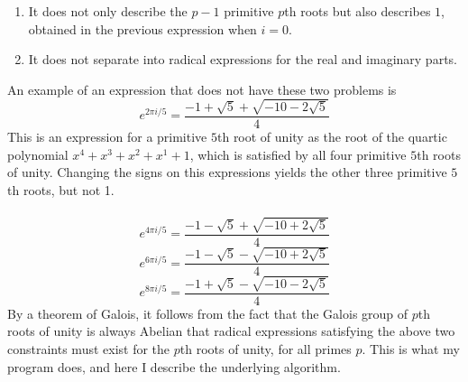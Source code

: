 \documentclass{article}
\begin{document}
    \begin{enumerate}
        \item It does not only describe the $ p - 1 $ primitive $ p $th roots but also describes $ 1 $, obtained in the previous expression when $ i = 0 $.
        \item It does not separate into radical expressions for the real and imaginary parts.
    \end{enumerate}
    An example of an expression that does not have these two problems is
$$ e^{2 \pi i/5} = \frac{-1 + \sqrt{5} + \sqrt{-10 - 2 \sqrt{5}}}{4} $$
    This is an expression for a primitive $ 5 $th root of unity as the root of the quartic polynomial $ x^4 + x^3 + x^2 + x^1 + 1 $, which is satisfied by all four primitive $ 5 $th roots of unity. Changing the signs on this expressions yields the other three primitive $ 5 $th roots, but not 1.\\
    \\
$$ e^{4 \pi i/5} = \frac{-1 - \sqrt{5} + \sqrt{-10 + 2 \sqrt{5}}}{4} $$
$$ e^{6 \pi i/5} = \frac{-1 - \sqrt{5} - \sqrt{-10 + 2 \sqrt{5}}}{4} $$
$$ e^{8 \pi i/5} = \frac{-1 + \sqrt{5} - \sqrt{-10 - 2 \sqrt{5}}}{4} $$
    By a theorem of Galois, it follows from the fact that the Galois group of $ p $th roots of unity is always Abelian that radical expressions satisfying the above two constraints must exist for the $ p $th roots of unity, for all primes $ p $. This is what my program does, and here I describe the underlying algorithm.\\
    \\
\end{document}
